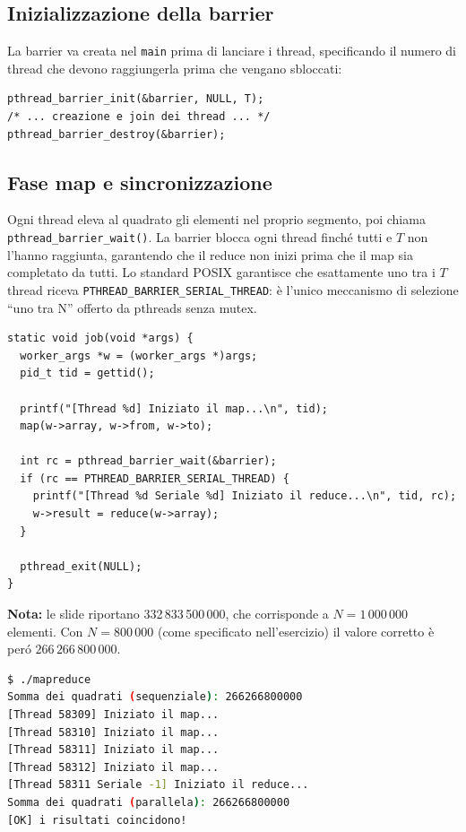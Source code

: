 \documentclass[a4paper,12pt]{article}
\begin{document}
\subsection*{Inizializzazione della barrier}

La barrier va creata nel \texttt{main} prima di lanciare i thread,
specificando il numero di thread che devono raggiungerla prima che
vengano sbloccati:

\begin{lstlisting}[caption={Inizializzazione e distruzione della barrier}]
pthread_barrier_init(&barrier, NULL, T);
/* ... creazione e join dei thread ... */
pthread_barrier_destroy(&barrier);
\end{lstlisting}

\subsection*{Fase map e sincronizzazione}

Ogni thread eleva al quadrato gli elementi nel proprio segmento, poi
chiama \texttt{pthread\_barrier\_wait()}.
La barrier blocca ogni thread finché tutti e $T$ non l'hanno raggiunta,
garantendo che il reduce non inizi prima che il map sia completato da tutti.
Lo standard POSIX garantisce che esattamente uno tra i $T$ thread riceva
\texttt{PTHREAD\_BARRIER\_SERIAL\_THREAD}: è l'unico meccanismo di
selezione ``uno tra N'' offerto da pthreads senza mutex.

\begin{lstlisting}[caption={Funzione job: map, barrier e reduce}]
static void job(void *args) {
  worker_args *w = (worker_args *)args;
  pid_t tid = gettid();

  printf("[Thread %d] Iniziato il map...\n", tid);
  map(w->array, w->from, w->to);

  int rc = pthread_barrier_wait(&barrier);
  if (rc == PTHREAD_BARRIER_SERIAL_THREAD) {
    printf("[Thread %d Seriale %d] Iniziato il reduce...\n", tid, rc);
    w->result = reduce(w->array);
  }

  pthread_exit(NULL);
}
\end{lstlisting}

\medskip
\noindent\textbf{Nota:} le slide riportano
332\,833\,500\,000, che corrisponde a $N = 1\,000\,000$ elementi.
Con $N = 800\,000$ (come specificato nell'esercizio) il valore corretto è
peró $266\,266\,800\,000$.

\begin{lstlisting}[language=bash, caption={Test Esercizio 2}]
$ ./mapreduce
Somma dei quadrati (sequenziale): 266266800000
[Thread 58309] Iniziato il map...
[Thread 58310] Iniziato il map...
[Thread 58311] Iniziato il map...
[Thread 58312] Iniziato il map...
[Thread 58311 Seriale -1] Iniziato il reduce...
Somma dei quadrati (parallela): 266266800000
[OK] i risultati coincidono!
\end{lstlisting}
\end{document}
